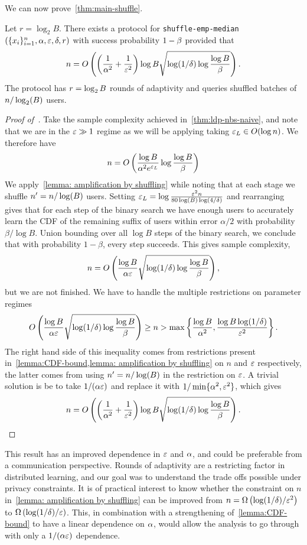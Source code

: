 %
We can now prove~\cref{thm:main-shuffle}.
\begin{theorem}\label{thm:restated-shuffle}
    Let $r=\log_2 B$. There exists a protocol for \texttt{shuffle\--emp\--median}$(\{x_i\}_{i=1}^n,\alpha,\varepsilon,\delta,r)$ with success probability $1-\beta$ provided that
    \[
    n=O\left( \left(\frac{1}{\alpha^2} +\frac{1}{\varepsilon^2}\right)\log B\sqrt{\log(1/\delta)\log\frac{\log B}{\beta}} \right).
    \]
    The protocol has $r=\log_2B$ rounds of adaptivity and queries shuffled batches of $n/\log_2(B)$ users. 
\end{theorem}
%
%
%
%
%
%
%
%
\begin{proof}[Proof of~]    
    Take the sample complexity achieved in~\autoref{thm:ldp-nbs-naive}, and note that we are in the $\varepsilon\gg 1$ regime as we will be applying taking $\varepsilon_L\in O(\log n)$. We therefore have
    \[
    n= O\left( \frac{\log B}{\alpha^2 e^{\varepsilon_L}}\log\frac{\log B}{\beta} \right)
    \]
    We apply~\autoref{lemma: amplification by shuffling} while noting that at each stage we shuffle $n'=n/\log(B)$ users. Setting $\varepsilon_L=\log\frac{\varepsilon^2 n}{80\log(B)\log(4/\delta)}$ and rearranging gives that for each step of the binary search we have enough users to accurately learn the CDF of the remaining suffix of users within error $\alpha/2$ with probability $\beta/\log B$. Union bounding over all $\log B$ steps of the binary search, we conclude that with probability $1-\beta$, every step succeeds. This gives sample complexity,
    \[
    n= O\left(\frac{\log B}{\alpha\varepsilon} \sqrt{\log(1/\delta)\log\frac{\log B}{\beta}} \right),
    \]
    but we are not finished. We have to handle the multiple restrictions on parameter regimes 
    \[
    O\left(\frac{\log B}{\alpha\varepsilon} \sqrt{\log(1/\delta)\log\frac{\log B}{\beta}} \right)\geq n >\max\left\{\frac{\log B}{\alpha^2},\frac{{\log B\log(1/\delta)}}{\varepsilon^2}\right\}.
    \]
    The right hand side of this inequality comes from restrictions present in~\cref{lemma:CDF-bound,lemma: amplification by shuffling} on $n$ and $\varepsilon$ respectively, the latter comes from using $n'=n/\log(B)$ in the restriction on $\varepsilon$. 
    A trivial solution is be to take $1/(\alpha\varepsilon)$ and replace it with $1/\min\{\alpha^2,\varepsilon^2\}$, which gives
    \[
    n=O\left( \left(\frac{1}{\alpha^2} +\frac{1}{\varepsilon^2}\right)\log B\sqrt{\log(1/\delta)\log\frac{\log B}{\beta}} \right).
    \]

   
\end{proof}

This result has an improved dependence in $\varepsilon$ and $\alpha$, and could be preferable from a communication perspective. Rounds of adaptivity are a restricting factor in distributed learning, and our goal was to understand the trade offs possible under privacy constraints. It is of practical interest to know whether the constraint on $n$ in~\cref{lemma: amplification by shuffling} can be improved from $n=\Omega\left(\log(1/\delta)/\varepsilon^2\right)$ to $\Omega\left(\log(1/\delta)/\varepsilon\right)$. This, in combination with a strengthening of~\cref{lemma:CDF-bound} to have a linear dependence on $\alpha$, would allow the analysis to go through with only a $1/(\alpha\varepsilon)$ dependence.